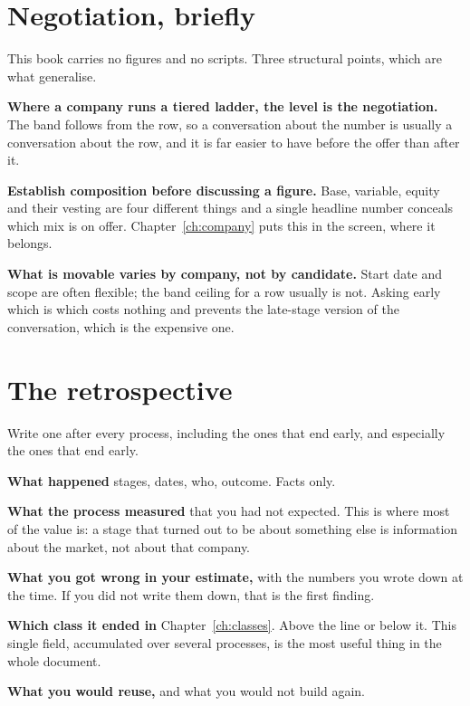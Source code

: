 \section{Negotiation, briefly}

This book carries no figures and no scripts. Three structural points, which are
what generalise.

\textbf{Where a company runs a tiered ladder, the level is the negotiation.}
The band follows from the row, so a conversation about the number is usually a
conversation about the row, and it is far easier to have before the offer than
after it.

\textbf{Establish composition before discussing a figure.} Base, variable,
equity and their vesting are four different things and a single headline number
conceals which mix is on offer. Chapter~\ref{ch:company} puts this in the
screen, where it belongs.

\textbf{What is movable varies by company, not by candidate.} Start date and
scope are often flexible; the band ceiling for a row usually is not. Asking
early which is which costs nothing and prevents the late-stage version of the
conversation, which is the expensive one.

\section{The retrospective}

Write one after every process, including the ones that end early, and
especially the ones that end early.

\begin{kitmethod}
\textbf{What happened} \dash{} stages, dates, who, outcome. Facts only.

\textbf{What the process measured} that you had not expected. This is where
most of the value is: a stage that turned out to be about something else is
information about the market, not about that company.

\textbf{What you got wrong in your estimate,} with the numbers you wrote down
at the time. If you did not write them down, that is the first finding.

\textbf{Which class it ended in} \dash{} Chapter~\ref{ch:classes}. Above the
line or below it. This single field, accumulated over several processes, is
the most useful thing in the whole document.

\textbf{What you would reuse,} and what you would not build again.
\end{kitmethod}

